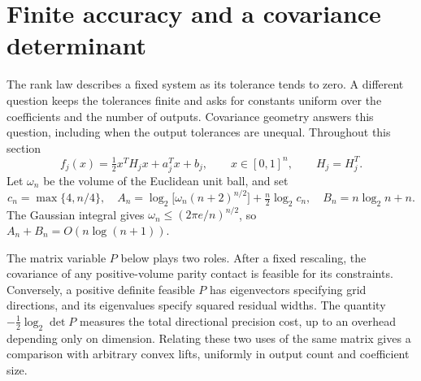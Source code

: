 \section{Finite accuracy and a covariance determinant}\label{sec:finite-quadratic}

The rank law describes a fixed system as its tolerance tends to zero.
A different question keeps the tolerances finite and asks for constants
uniform over the coefficients and the number of outputs. Covariance
geometry answers this question, including when the output tolerances
are unequal. Throughout this section
\[
 f_j(x)=\tfrac12x^TH_jx+a_j^Tx+b_j,\qquad x\in[0,1]^n,
 \qquad H_j=H_j^T.
\]
Let $\omega_n$ be the volume of the Euclidean unit ball, and set
\begin{equation}\label{eq:finite-constants}
 c_n=\max\{4,n/4\},\quad
 A_n=\log_2\!\bigl[\omega_n(n+2)^{n/2}\bigr]
                   +\tfrac n2\log_2c_n,\quad
 B_n=n\log_2 n+n.
\end{equation}
The Gaussian integral gives
$\omega_n\le(2\pi e/n)^{n/2}$, so $A_n+B_n=O(n\log(n+1))$.

The matrix variable $P$ below plays two roles. After a fixed rescaling,
the covariance of any positive-volume parity contact is feasible for its
constraints. Conversely, a positive definite feasible $P$ has eigenvectors
specifying grid directions, and its eigenvalues specify squared residual
widths. The quantity $-\tfrac12\log_2\det P$ measures the total directional
precision cost, up to an overhead depending only on dimension.
Relating these two uses of the same matrix gives
a comparison with arbitrary convex lifts, uniformly in output count and
coefficient size.

